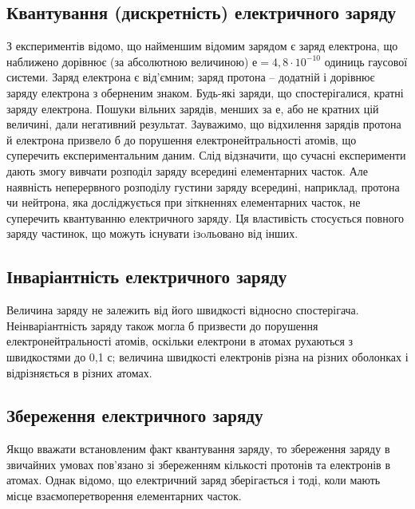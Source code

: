 \subsection*{Квантування (дискретність) електричного заряду}


З експериментів відомо, що найменшим відомим зарядом є заряд електрона, що наближено дорівнює (за абсолютною величиною) $е=4,8\cdot10^{-10}$ одиниць
гаусової системи. Заряд електрона є від’ємним; заряд протона – додатній і дорівнює заряду електрона з оберненим знаком. Будь-які заряди, що
спостерігалися, кратні заряду електрона. Пошуки вільних зарядів, менших за е, або не кратних цій величині, дали негативний результат. Зауважимо, що
відхилення зарядів протона й електрона призвело б до порушення електронейтральності атомів, що суперечить експериментальним даним. Слід відзначити, що
сучасні експерименти дають змогу вивчати розподіл заряду всередині елементарних часток. Але наявність неперервного розподілу густини заряду всередині,
наприклад, протона чи нейтрона, яка досліджується при зіткненнях елементарних часток, не суперечить квантуванню електричного заряду. Ця властивість
стосується повного заряду частинок, що можуть існувати iзoльовано від інших.

\subsection*{Інваріантність електричного заряду}


Величина заряду не залежить від
його швидкості відносно спостерігача. Неінваріантність заряду також могла б
призвести до порушення електронейтральності атомів, оскільки електрони в
атомах рухаються з швидкостями до 0,1 с; величина швидкості електронів
різна на різних оболонках і відрізняється в різних атомах.


\subsection*{Збереження електричного заряду}


Якщо вважати встановленим факт
квантування заряду, то збереження заряду в звичайних умовах пов’язано зі
збереженням кількості протонів та електронів в атомах. Однак відомо, що
електричний заряд зберігається і тоді, коли мають місце взаємоперетворення
елементарних часток.

